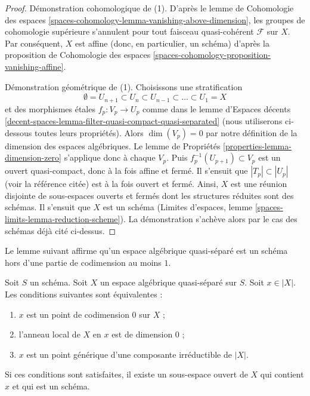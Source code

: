 \begin{proof}
\medskip\noindent
Démonstration cohomologique de (1). D'après le lemme de Cohomologie des espaces
\ref{spaces-cohomology-lemma-vanishing-above-dimension},
les groupes de cohomologie supérieure s'annulent pour tout
faisceau quasi-cohérent $\mathcal{F}$ sur $X$. Par conséquent, $X$
est affine (donc, en particulier, un schéma) d'après la
proposition de Cohomologie des espaces
\ref{spaces-cohomology-proposition-vanishing-affine}.

\medskip\noindent
Démonstration géométrique de (1). Choisissons une stratification
$$
\emptyset = U_{n + 1} \subset
U_n \subset U_{n - 1} \subset \ldots \subset U_1 = X
$$
et des morphismes étales $f_p : V_p \to U_p$ comme dans le
lemme d'Espaces décents
\ref{decent-spaces-lemma-filter-quasi-compact-quasi-separated}
(nous utiliserons ci-dessous toutes leurs propriétés).
Alors $\dim(V_p) = 0$ par notre définition de la dimension des espaces
algébriques. Le lemme de Propriétés \ref{properties-lemma-dimension-zero}
s'applique donc à chaque $V_p$. Puis $f_p^{-1}(U_{p + 1}) \subset V_p$
est un ouvert quasi-compact, donc à la fois affine et fermé.
Il s'ensuit que $|T_p| \subset |U_p|$ (voir la référence citée)
est à la fois ouvert et fermé. Ainsi, $X$ est une réunion disjointe
de sous-espaces ouverts et fermés dont les structures réduites sont des schémas.
Il s'ensuit que $X$ est un schéma
(Limites d'espaces, lemme \ref{spaces-limits-lemma-reduction-scheme}).
La démonstration s'achève alors par le cas des schémas
déjà cité ci-dessus.
\end{proof}

\noindent
Le lemme suivant affirme qu'un espace algébrique quasi-séparé
est un schéma hors d'une partie de codimension au moins $1$.

\begin{lemma}
\label{lemma-generic-point-in-schematic-locus}
Soit $S$ un schéma. Soit $X$ un espace algébrique quasi-séparé sur $S$.
Soit $x \in |X|$. Les conditions suivantes sont équivalentes :
\begin{enumerate}
\item $x$ est un point de codimension $0$ sur $X$ ;
\item l'anneau local de $X$ en $x$ est de dimension $0$ ;
\item $x$ est un point générique d'une composante irréductible de $|X|$.
\end{enumerate}
Si ces conditions sont satisfaites, il existe un sous-espace ouvert de $X$
qui contient $x$ et qui est un schéma.
\end{lemma}

